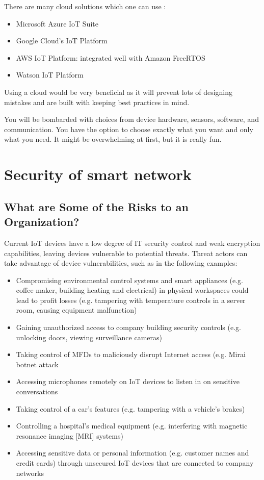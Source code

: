\documentclass[12pt]{report}
\begin{document}
There are many cloud solutions which one can use :

\begin{itemize}
    \item Microsoft Azure IoT Suite
    \item Google Cloud’s IoT Platform
    \item AWS IoT Platform: integrated well with Amazon FreeRTOS
    \item Watson IoT Platform
\end{itemize}

Using a cloud would be very beneficial as it will prevent lots of designing mistakes and are built with keeping best practices in mind.

You will be bombarded with choices from device hardware, sensors, software, and communication. You have the option to choose exactly what you want and only what you need. It might be overwhelming at first, but it is really fun.

\chapter{Security of smart network}

\section{What are Some of the Risks to an Organization?}

Current IoT devices have a low degree of IT security control and weak encryption 
capabilities, leaving devices vulnerable to potential threats. 
Threat actors can take advantage of device vulnerabilities, such as in the 
following examples:

\begin{itemize}
    \item Compromising environmental control systems and smart appliances (e.g.
          coffee maker, building heating and electrical) in physical workspaces could lead to profit losses (e.g. tampering with temperature controls in a server room, causing equipment malfunction)
    \item Gaining unauthorized access to company building security controls (e.g. unlocking doors, viewing surveillance cameras)
    \item Taking control of MFDs to maliciously disrupt Internet access (e.g. Mirai botnet attack
    \item Accessing microphones remotely on IoT devices to listen in on sensitive conversations
    \item Taking control of a car’s features (e.g. tampering with a vehicle’s brakes)
    \item Controlling a hospital’s medical equipment (e.g. interfering with
          magnetic resonance imaging [MRI] systems)
    \item Accessing sensitive data or personal information (e.g. customer names
          and credit cards) through unsecured IoT devices that are connected to company networks
\end{itemize}
\end{document}
